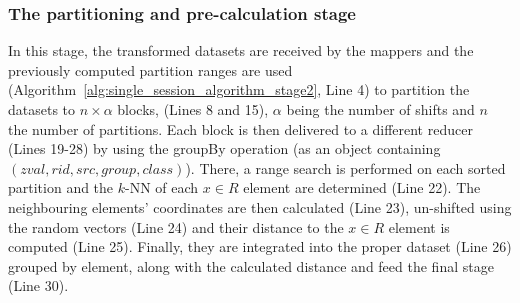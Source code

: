 \subsubsection{The partitioning and pre-calculation stage}
\label{subsec:fzknn3_2}
In this stage, the transformed datasets are received by the mappers and the previously computed partition ranges are used (Algorithm~\ref{alg:single_session_algorithm_stage2}, Line 4) to partition the datasets to $n\times\alpha$ blocks, (Lines 8 and 15), $\alpha$ being the number of shifts and $n$ the number of partitions. Each block is then delivered to a different reducer (Lines 19-28) by using the groupBy operation (as an object containing $(zval, rid, src, group, class)$). There, a range search is performed on each sorted partition and the $k$-NN of each $x \in R$ element are determined (Line 22). The neighbouring elements' coordinates are then calculated (Line 23), un-shifted using the random vectors (Line 24) and their distance to the $x \in R$ element is computed (Line 25). Finally, they are integrated into the proper dataset (Line 26) grouped by element, along with the calculated distance and feed the final stage (Line 30).

